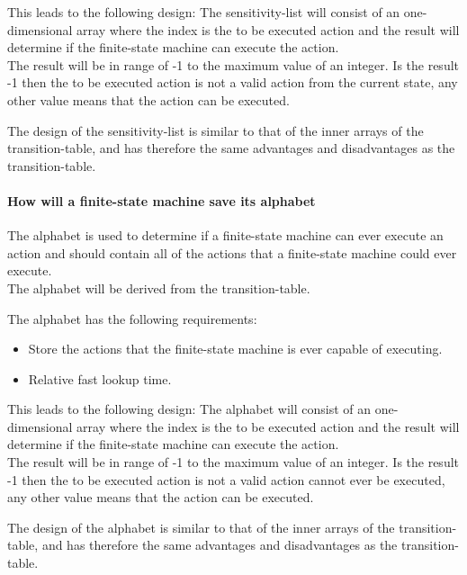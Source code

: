 This leads to the following design: The sensitivity-list will consist of
an one-dimensional array where the index is the to be executed action
and the result will determine if the finite-state machine can execute
the action.\\
The result will be in range of -1 to the maximum value of an integer. Is
the result -1 then the to be executed action is not a valid action from
the current state, any other value means that the action can be
executed.

The design of the sensitivity-list is similar to that of the inner
arrays of the transition-table, and has therefore the same advantages
and disadvantages as the transition-table.

\hypertarget{how-will-a-finite-state-machine-save-its-alphabet}{%
\paragraph{How will a finite-state machine save its
alphabet}\label{how-will-a-finite-state-machine-save-its-alphabet}}

The alphabet is used to determine if a finite-state machine can ever
execute an action and should contain all of the actions that a
finite-state machine could ever execute.\\
The alphabet will be derived from the transition-table.

The alphabet has the following requirements:

\begin{itemize}
\tightlist
\item
  Store the actions that the finite-state machine is ever capable of
  executing.
\item
  Relative fast lookup time.
\end{itemize}

This leads to the following design: The alphabet will consist of an
one-dimensional array where the index is the to be executed action and
the result will determine if the finite-state machine can execute the
action.\\
The result will be in range of -1 to the maximum value of an integer. Is
the result -1 then the to be executed action is not a valid action
cannot ever be executed, any other value means that the action can be
executed.

The design of the alphabet is similar to that of the inner arrays of the
transition-table, and has therefore the same advantages and
disadvantages as the transition-table.

